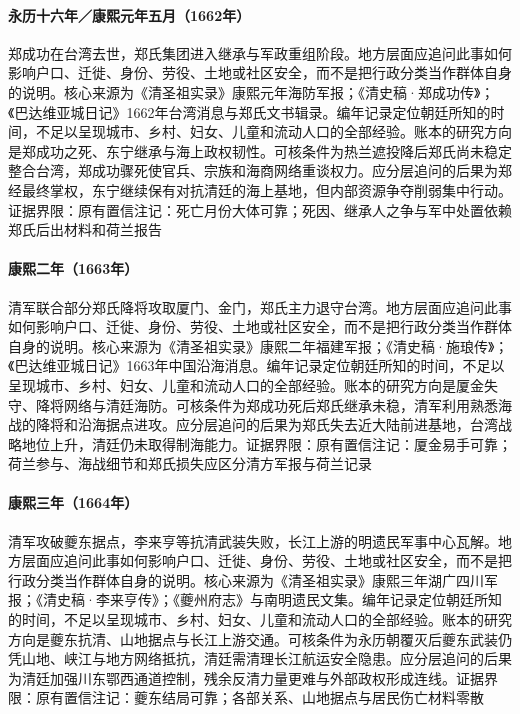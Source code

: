 \hypertarget{social:EQ-1662-ZHENG-DEATH}{}\paragraph{永历十六年／康熙元年五月（1662年）}郑成功在台湾去世，郑氏集团进入继承与军政重组阶段。地方层面应追问此事如何影响户口、迁徙、身份、劳役、土地或社区安全，而不是把行政分类当作群体自身的说明。核心来源为《清圣祖实录》康熙元年海防军报；《清史稿·郑成功传》；《巴达维亚城日记》1662年台湾消息与郑氏文书辑录。编年记录定位朝廷所知的时间，不足以呈现城市、乡村、妇女、儿童和流动人口的全部经验。账本的研究方向是郑成功之死、东宁继承与海上政权韧性。可核条件为热兰遮投降后郑氏尚未稳定整合台湾，郑成功骤死使官兵、宗族和海商网络重谈权力。应分层追问的后果为郑经最终掌权，东宁继续保有对抗清廷的海上基地，但内部资源争夺削弱集中行动。证据界限：原有置信注记：死亡月份大体可靠；死因、继承人之争与军中处置依赖郑氏后出材料和荷兰报告
\hypertarget{social:EQ-1663-XIAMEN-JINMEN}{}\paragraph{康熙二年（1663年）}清军联合部分郑氏降将攻取厦门、金门，郑氏主力退守台湾。地方层面应追问此事如何影响户口、迁徙、身份、劳役、土地或社区安全，而不是把行政分类当作群体自身的说明。核心来源为《清圣祖实录》康熙二年福建军报；《清史稿·施琅传》；《巴达维亚城日记》1663年中国沿海消息。编年记录定位朝廷所知的时间，不足以呈现城市、乡村、妇女、儿童和流动人口的全部经验。账本的研究方向是厦金失守、降将网络与清廷海防。可核条件为郑成功死后郑氏继承未稳，清军利用熟悉海战的降将和沿海据点进攻。应分层追问的后果为郑氏失去近大陆前进基地，台湾战略地位上升，清廷仍未取得制海能力。证据界限：原有置信注记：厦金易手可靠；荷兰参与、海战细节和郑氏损失应区分清方军报与荷兰记录
\hypertarget{social:EQ-1664-KUIZHOU}{}\paragraph{康熙三年（1664年）}清军攻破夔东据点，李来亨等抗清武装失败，长江上游的明遗民军事中心瓦解。地方层面应追问此事如何影响户口、迁徙、身份、劳役、土地或社区安全，而不是把行政分类当作群体自身的说明。核心来源为《清圣祖实录》康熙三年湖广四川军报；《清史稿·李来亨传》；《夔州府志》与南明遗民文集。编年记录定位朝廷所知的时间，不足以呈现城市、乡村、妇女、儿童和流动人口的全部经验。账本的研究方向是夔东抗清、山地据点与长江上游交通。可核条件为永历朝覆灭后夔东武装仍凭山地、峡江与地方网络抵抗，清廷需清理长江航运安全隐患。应分层追问的后果为清廷加强川东鄂西通道控制，残余反清力量更难与外部政权形成连线。证据界限：原有置信注记：夔东结局可靠；各部关系、山地据点与居民伤亡材料零散
